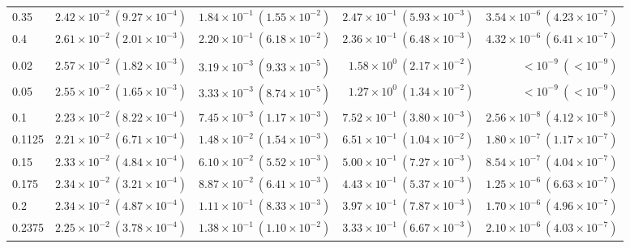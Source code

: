 \begin{table}[htbp]
\begin{tabular}{@{} l rrrr @{}}
0.35 & $2.42\!\times\!10^{-2}\ (9.27\!\times\!10^{-4})$ & $1.84\!\times\!10^{-1}\ (1.55\!\times\!10^{-2})$ & $2.47\!\times\!10^{-1}\ (5.93\!\times\!10^{-3})$ & $3.54\!\times\!10^{-6}\ (4.23\!\times\!10^{-7})$ \\
0.4 & $2.61\!\times\!10^{-2}\ (2.01\!\times\!10^{-3})$ & $2.20\!\times\!10^{-1}\ (6.18\!\times\!10^{-2})$ & $2.36\!\times\!10^{-1}\ (6.48\!\times\!10^{-3})$ & $4.32\!\times\!10^{-6}\ (6.41\!\times\!10^{-7})$ \\
\addlinespace
\multicolumn{5}{@{}l}{\textit{Medium ($p \sim \mathcal{U}(0.1125, 0.2375)$)}} \\
0.02 & $2.57\!\times\!10^{-2}\ (1.82\!\times\!10^{-3})$ & $3.19\!\times\!10^{-3}\ (9.33\!\times\!10^{-5})$ & $1.58\!\times\!10^{0}\ (2.17\!\times\!10^{-2})$ & $<\!10^{-9}\ (<\!10^{-9})$ \\
0.05 & $2.55\!\times\!10^{-2}\ (1.65\!\times\!10^{-3})$ & $3.33\!\times\!10^{-3}\ (8.74\!\times\!10^{-5})$ & $1.27\!\times\!10^{0}\ (1.34\!\times\!10^{-2})$ & $<\!10^{-9}\ (<\!10^{-9})$ \\
0.1 & $2.23\!\times\!10^{-2}\ (8.22\!\times\!10^{-4})$ & $7.45\!\times\!10^{-3}\ (1.17\!\times\!10^{-3})$ & $7.52\!\times\!10^{-1}\ (3.80\!\times\!10^{-3})$ & $2.56\!\times\!10^{-8}\ (4.12\!\times\!10^{-8})$ \\
0.1125 & $2.21\!\times\!10^{-2}\ (6.71\!\times\!10^{-4})$ & $1.48\!\times\!10^{-2}\ (1.54\!\times\!10^{-3})$ & $6.51\!\times\!10^{-1}\ (1.04\!\times\!10^{-2})$ & $1.80\!\times\!10^{-7}\ (1.17\!\times\!10^{-7})$ \\
0.15 & $2.33\!\times\!10^{-2}\ (4.84\!\times\!10^{-4})$ & $6.10\!\times\!10^{-2}\ (5.52\!\times\!10^{-3})$ & $5.00\!\times\!10^{-1}\ (7.27\!\times\!10^{-3})$ & $8.54\!\times\!10^{-7}\ (4.04\!\times\!10^{-7})$ \\
0.175 & $2.34\!\times\!10^{-2}\ (3.21\!\times\!10^{-4})$ & $8.87\!\times\!10^{-2}\ (6.41\!\times\!10^{-3})$ & $4.43\!\times\!10^{-1}\ (5.37\!\times\!10^{-3})$ & $1.25\!\times\!10^{-6}\ (6.63\!\times\!10^{-7})$ \\
0.2 & $2.34\!\times\!10^{-2}\ (4.87\!\times\!10^{-4})$ & $1.11\!\times\!10^{-1}\ (8.33\!\times\!10^{-3})$ & $3.97\!\times\!10^{-1}\ (7.87\!\times\!10^{-3})$ & $1.70\!\times\!10^{-6}\ (4.96\!\times\!10^{-7})$ \\
0.2375 & $2.25\!\times\!10^{-2}\ (3.78\!\times\!10^{-4})$ & $1.38\!\times\!10^{-1}\ (1.10\!\times\!10^{-2})$ & $3.33\!\times\!10^{-1}\ (6.67\!\times\!10^{-3})$ & $2.10\!\times\!10^{-6}\ (4.03\!\times\!10^{-7})$ \\

\end{tabular}
\end{table}
